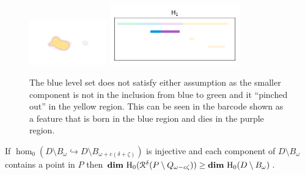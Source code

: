 \begin{figure}[htbp]
  \includegraphics[trim=300 150 300 200, clip, width=0.3\textwidth]{scripts/figures/surf/ass1_D_top.png}
  \includegraphics[width=0.5\textwidth]{scripts/figures/scalar_barcode_H1-masked.png}
  \caption{The blue level set does not satisfy either assumption as the smaller component is not in the inclusion from blue to green and it ``pinched out'' in the yellow region. This can be seen in the barcode shown as a feature that is born in the blue region and dies in the purple region.}
\end{figure}


\begin{lemma}\label{lem:assumption2}
  If $\hom_0(D\setminus B_\omega\hookrightarrow D\setminus B_{\omega+c(\delta+\zeta)})$ is injective and each component of $D\setminus B_\omega$ contains a point in $P$ then $\mathbf{dim}~\mathrm{H}_0(\mathcal{R}^\delta(P\setminus Q_{\omega-c\zeta})) \geq \mathbf{dim}~\mathrm{H}_0(D\setminus B_\omega)$.
\end{lemma}

